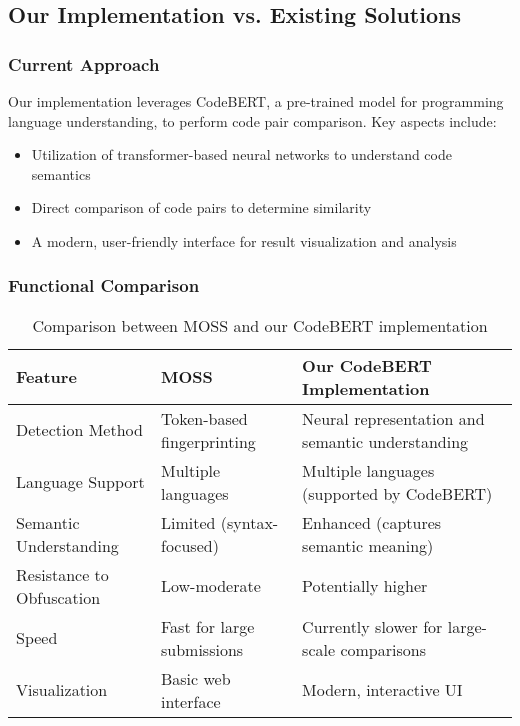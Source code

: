 \documentclass[12pt, titlepage]{article}
\begin{document}
\subsection{Our Implementation vs. Existing Solutions}

\subsubsection{Current Approach}
Our implementation leverages CodeBERT, a pre-trained model for programming language understanding, to perform code pair comparison. Key aspects include:
\begin{itemize}
    \item Utilization of transformer-based neural networks to understand code semantics
    \item Direct comparison of code pairs to determine similarity
    \item A modern, user-friendly interface for result visualization and analysis
\end{itemize}

\subsubsection{Functional Comparison}

\begin{table}[h]
\centering
\begin{tabular}{|p{3cm}|p{5cm}|p{5cm}|}
\hline
\textbf{Feature} & \textbf{MOSS} & \textbf{Our CodeBERT Implementation} \\
\hline
Detection Method & Token-based fingerprinting & Neural representation and semantic understanding \\
\hline
Language Support & Multiple languages & Multiple languages (supported by CodeBERT) \\
\hline
Semantic Understanding & Limited (syntax-focused) & Enhanced (captures semantic meaning) \\
\hline
Resistance to Obfuscation & Low-moderate & Potentially higher \\
\hline
Speed & Fast for large submissions & Currently slower for large-scale comparisons \\
\hline
Visualization & Basic web interface & Modern, interactive UI \\
\hline
\end{tabular}
\caption{Comparison between MOSS and our CodeBERT implementation}
\label{tab:comparison}
\end{table}
\end{document}
